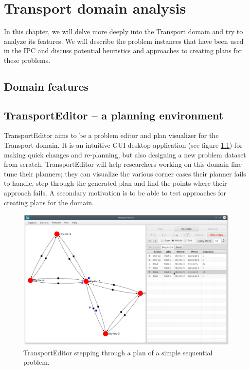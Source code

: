 \chapter{Transport domain analysis}

In this chapter, we will delve more deeply into the Transport domain and try to analyze its features.
We will describe the problem instances that have been used in the IPC and discuss potential
heuristics and approaches to creating plans for these problems.

\section{Domain features}




\section{TransportEditor -- a planning environment}

TransportEditor aims to be a problem editor and plan visualizer for the Transport domain.
It is an intuitive GUI desktop application (see figure \ref{fig:transporteditor-screenshot}) for making quick changes and re-planning, but also designing a new problem dataset from scratch. TransportEditor will help researchers working on this domain fine-tune their planners; they can visualize the various corner cases their planner fails to handle, step through the generated plan and find the points where their approach fails.
A secondary motivation is to be able to test approaches for creating plans for the domain.

\begin{figure}[htb]
\begin{center}
\includegraphics[width=1.0\textwidth]{../img/transporteditor_screenshot}
\end{center}
\caption{TransportEditor stepping through a plan of a simple sequential problem.}
\label{fig:transporteditor-screenshot}
\end{figure}

